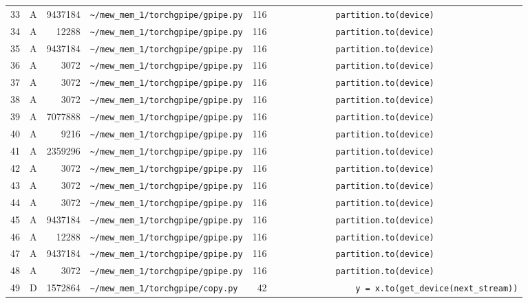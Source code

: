 \documentclass{article}
\begin{document}
\begin{longtable}{r l r p{6.5cm} r p{7.0cm}}
33 & A & 9437184 & \lstinline|~/mew_mem_1/torchgpipe/gpipe.py| & 116 & \lstinline|            partition.to(device)| \\
34 & A & 12288 & \lstinline|~/mew_mem_1/torchgpipe/gpipe.py| & 116 & \lstinline|            partition.to(device)| \\
35 & A & 9437184 & \lstinline|~/mew_mem_1/torchgpipe/gpipe.py| & 116 & \lstinline|            partition.to(device)| \\
36 & A & 3072 & \lstinline|~/mew_mem_1/torchgpipe/gpipe.py| & 116 & \lstinline|            partition.to(device)| \\
37 & A & 3072 & \lstinline|~/mew_mem_1/torchgpipe/gpipe.py| & 116 & \lstinline|            partition.to(device)| \\
38 & A & 3072 & \lstinline|~/mew_mem_1/torchgpipe/gpipe.py| & 116 & \lstinline|            partition.to(device)| \\
39 & A & 7077888 & \lstinline|~/mew_mem_1/torchgpipe/gpipe.py| & 116 & \lstinline|            partition.to(device)| \\
40 & A & 9216 & \lstinline|~/mew_mem_1/torchgpipe/gpipe.py| & 116 & \lstinline|            partition.to(device)| \\
41 & A & 2359296 & \lstinline|~/mew_mem_1/torchgpipe/gpipe.py| & 116 & \lstinline|            partition.to(device)| \\
42 & A & 3072 & \lstinline|~/mew_mem_1/torchgpipe/gpipe.py| & 116 & \lstinline|            partition.to(device)| \\
43 & A & 3072 & \lstinline|~/mew_mem_1/torchgpipe/gpipe.py| & 116 & \lstinline|            partition.to(device)| \\
44 & A & 3072 & \lstinline|~/mew_mem_1/torchgpipe/gpipe.py| & 116 & \lstinline|            partition.to(device)| \\
45 & A & 9437184 & \lstinline|~/mew_mem_1/torchgpipe/gpipe.py| & 116 & \lstinline|            partition.to(device)| \\
46 & A & 12288 & \lstinline|~/mew_mem_1/torchgpipe/gpipe.py| & 116 & \lstinline|            partition.to(device)| \\
47 & A & 9437184 & \lstinline|~/mew_mem_1/torchgpipe/gpipe.py| & 116 & \lstinline|            partition.to(device)| \\
48 & A & 3072 & \lstinline|~/mew_mem_1/torchgpipe/gpipe.py| & 116 & \lstinline|            partition.to(device)| \\
49 & D & 1572864 & \lstinline|~/mew_mem_1/torchgpipe/copy.py| & 42 & \lstinline|                y = x.to(get_device(next_stream))| \\

\end{longtable}
\end{document}
